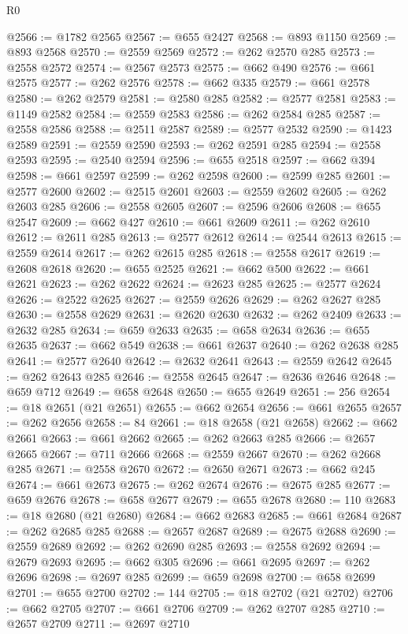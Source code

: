 \begin{lexlean}{R0}
\begin{coremodule}
@2566 := @1782 @2565
@2567 := @655 @2427
@2568 := @893 @1150
@2569 := @893 @2568
@2570 := @2559 @2569
@2572 := @262 @2570 @285
@2573 := @2558 @2572
@2574 := @2567 @2573
@2575 := @662 @490
@2576 := @661 @2575
@2577 := @262 @2576
@2578 := @662 @335
@2579 := @661 @2578
@2580 := @262 @2579
@2581 := @2580 @285
@2582 := @2577 @2581
@2583 := @1149 @2582
@2584 := @2559 @2583
@2586 := @262 @2584 @285
@2587 := @2558 @2586
@2588 := @2511 @2587
@2589 := @2577 @2532
@2590 := @1423 @2589
@2591 := @2559 @2590
@2593 := @262 @2591 @285
@2594 := @2558 @2593
@2595 := @2540 @2594
@2596 := @655 @2518
@2597 := @662 @394
@2598 := @661 @2597
@2599 := @262 @2598
@2600 := @2599 @285
@2601 := @2577 @2600
@2602 := @2515 @2601
@2603 := @2559 @2602
@2605 := @262 @2603 @285
@2606 := @2558 @2605
@2607 := @2596 @2606
@2608 := @655 @2547
@2609 := @662 @427
@2610 := @661 @2609
@2611 := @262 @2610
@2612 := @2611 @285
@2613 := @2577 @2612
@2614 := @2544 @2613
@2615 := @2559 @2614
@2617 := @262 @2615 @285
@2618 := @2558 @2617
@2619 := @2608 @2618
@2620 := @655 @2525
@2621 := @662 @500
@2622 := @661 @2621
@2623 := @262 @2622
@2624 := @2623 @285
@2625 := @2577 @2624
@2626 := @2522 @2625
@2627 := @2559 @2626
@2629 := @262 @2627 @285
@2630 := @2558 @2629
@2631 := @2620 @2630
@2632 := @262 @2409
@2633 := @2632 @285
@2634 := @659 @2633
@2635 := @658 @2634
@2636 := @655 @2635
@2637 := @662 @549
@2638 := @661 @2637
@2640 := @262 @2638 @285
@2641 := @2577 @2640
@2642 := @2632 @2641
@2643 := @2559 @2642
@2645 := @262 @2643 @285
@2646 := @2558 @2645
@2647 := @2636 @2646
@2648 := @659 @712
@2649 := @658 @2648
@2650 := @655 @2649
@2651 := 256
@2654 := @18 @2651 (@21 @2651)
@2655 := @662 @2654
@2656 := @661 @2655
@2657 := @262 @2656
@2658 := 84
@2661 := @18 @2658 (@21 @2658)
@2662 := @662 @2661
@2663 := @661 @2662
@2665 := @262 @2663 @285
@2666 := @2657 @2665
@2667 := @711 @2666
@2668 := @2559 @2667
@2670 := @262 @2668 @285
@2671 := @2558 @2670
@2672 := @2650 @2671
@2673 := @662 @245
@2674 := @661 @2673
@2675 := @262 @2674
@2676 := @2675 @285
@2677 := @659 @2676
@2678 := @658 @2677
@2679 := @655 @2678
@2680 := 110
@2683 := @18 @2680 (@21 @2680)
@2684 := @662 @2683
@2685 := @661 @2684
@2687 := @262 @2685 @285
@2688 := @2657 @2687
@2689 := @2675 @2688
@2690 := @2559 @2689
@2692 := @262 @2690 @285
@2693 := @2558 @2692
@2694 := @2679 @2693
@2695 := @662 @305
@2696 := @661 @2695
@2697 := @262 @2696
@2698 := @2697 @285
@2699 := @659 @2698
@2700 := @658 @2699
@2701 := @655 @2700
@2702 := 144
@2705 := @18 @2702 (@21 @2702)
@2706 := @662 @2705
@2707 := @661 @2706
@2709 := @262 @2707 @285
@2710 := @2657 @2709
@2711 := @2697 @2710

\end{coremodule}
\end{lexlean}
